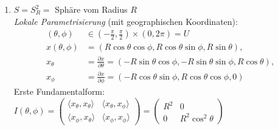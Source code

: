 \begin{example}
\begin{enumerate}
    \item \( S = S_R^2 = \) Sphäre vom Radius \( R \) \\
    \emph{Lokale Parametrisierung} (mit geographischen Koordinaten):
    \begin{align*}
      (\theta, \phi) &\in (-\frac{\pi}{2}, \frac{\pi}{2}) \times (0, 2\pi) = U \\
      x(\theta, \phi) &= \left( R\cos \theta \cos \phi, R \cos \theta \sin \phi, R \sin \theta \right)\text{,} \\
      x_\theta &= \frac{\partial x}{\partial \theta} = \left( - R \sin \theta \cos \phi, -R \sin \theta \sin \phi, R \cos \theta \right)\text{,} \\
      x_\phi &= \frac{\partial x}{\partial \phi} = \left( - R \cos \theta \sin \phi, R \cos \theta \cos \phi, 0 \right)
    \end{align*}
    Erste Fundamentalform: \( I(\theta, \phi) = \begin{pmatrix}
      \langle x_\theta, x_\theta \rangle & \langle x_\theta, x_\phi \rangle \\
      \langle x_\phi, x_\theta \rangle & \langle x_\phi, x_\phi \rangle
    \end{pmatrix} = \begin{pmatrix}
        R^2 & 0 \\
        0 & R^2\cos^2 \theta
      \end{pmatrix} \)
  \end{enumerate}
\end{example}

